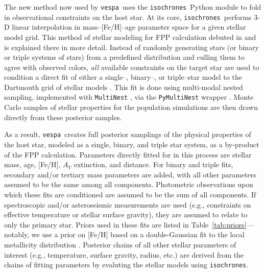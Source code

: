 \documentclass{emulateapj}
\newcommand{\Tab}[1]{Table~\ref{tab:#1}}
\newcommand{\tab}[1]{\Tab{#1}}
\newcommand{\vespa}{\texttt{vespa}}
\newcommand{\isochrones}{\texttt{isochrones}}
\begin{document}
The new method now used by \vespa\ uses the \isochrones\ Python module
\citep{isochrones} to fold in observational constraints on the host
star.  At its core, \isochrones\ performs 3-D linear interpolation in
mass--[Fe/H]--age parameter space for a given stellar model grid.
This method of stellar modeling for FPP calculation debuted in
\citet{Montet:2015} and is explained there in more detail.  Instead of
randomly generating stars (or binary or triple systems of stars) from
a predefined distribution and culling them to agree with observed
colors, \emph{all} available constraints on the target star are used
to condition a direct fit of either a single--, binary--, or
triple--star model to the Dartmouth grid of stellar models
\citep{Dotter:2008, Feiden:2011}.  This fit is done using multi-modal
nested sampling, implemented with \texttt{MultiNest}
\citep{Feroz:2009, Feroz:2011, Feroz:2013}, via the
\texttt{PyMultiNest} wrapper \citep{Buchner:2014}.  Monte Carlo
samples of stellar properties for the population simulations are then
drawn directly from these posterior samples.

As a result, \vespa\ creates full posterior samplings of the physical
properties of the host star, modeled as a single, binary, and triple
star system, as a by-product of the FPP calculation.  Parameters
directly fitted for in this process are stellar mass, age, [Fe/H],
$A_V$ extinction, and distance.  For binary and triple fits, secondary
and/or tertiary mass parameters are added, with all other parameters
assumed to be the same among all components.  Photometric observations
upon which these fits are conditioned are assumed to be the sum of all
components.  If spectroscopic and/or asteroseismic measurements are
used (e.g., constraints on effective temperature or stellar surface
gravity), they are assumed to relate to only the primary star.  Priors
used in these fits are listed in \tab{priors}---notably, we
use a prior on [Fe/H] based on a double-Gaussian fit to the local
metallicity distribution \citep{Hayden:2015, Casagrande:2011}.  Posterior
chains of all other stellar parameters of interest (e.g., temperature,
surface gravity, radius, etc.) are derived from the chains of fitting
parameters by evaluting the stellar models using \isochrones.
\end{document}
